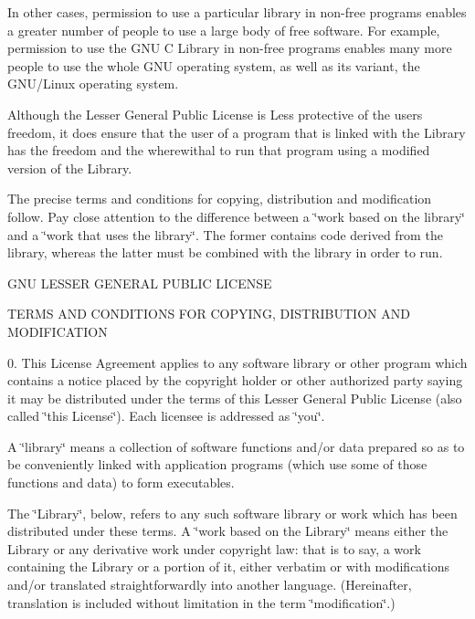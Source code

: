 In other cases, permission to use a particular library in non-\/free programs enables a greater number of people to use a large body of free software. For example, permission to use the G\+NU C Library in non-\/free programs enables many more people to use the whole G\+NU operating system, as well as its variant, the G\+N\+U/\+Linux operating system.

Although the Lesser General Public License is Less protective of the users\textquotesingle{} freedom, it does ensure that the user of a program that is linked with the Library has the freedom and the wherewithal to run that program using a modified version of the Library.

The precise terms and conditions for copying, distribution and modification follow. Pay close attention to the difference between a \char`\"{}work based on the library\char`\"{} and a \char`\"{}work that uses the library\char`\"{}. The former contains code derived from the library, whereas the latter must be combined with the library in order to run. \begin{DoxyVerb}              GNU LESSER GENERAL PUBLIC LICENSE
\end{DoxyVerb}
 T\+E\+R\+MS A\+ND C\+O\+N\+D\+I\+T\+I\+O\+NS F\+OR C\+O\+P\+Y\+I\+NG, D\+I\+S\+T\+R\+I\+B\+U\+T\+I\+ON A\+ND M\+O\+D\+I\+F\+I\+C\+A\+T\+I\+ON

0. This License Agreement applies to any software library or other program which contains a notice placed by the copyright holder or other authorized party saying it may be distributed under the terms of this Lesser General Public License (also called \char`\"{}this License\char`\"{}). Each licensee is addressed as \char`\"{}you\char`\"{}.

A \char`\"{}library\char`\"{} means a collection of software functions and/or data prepared so as to be conveniently linked with application programs (which use some of those functions and data) to form executables.

The \char`\"{}\+Library\char`\"{}, below, refers to any such software library or work which has been distributed under these terms. A \char`\"{}work based on the
\+Library\char`\"{} means either the Library or any derivative work under copyright law\+: that is to say, a work containing the Library or a portion of it, either verbatim or with modifications and/or translated straightforwardly into another language. (Hereinafter, translation is included without limitation in the term \char`\"{}modification\char`\"{}.)

